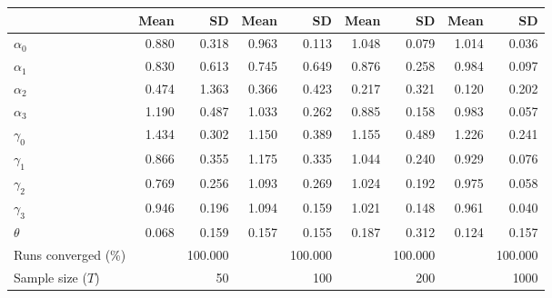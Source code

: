 
\begin{tabular}[t]{lrrrrrrrr}
\toprule
  & Mean & SD & Mean  & SD  & Mean   & SD   & Mean    & SD   \\
\midrule
$\alpha_{0}$ & 0.880 & 0.318 & 0.963 & 0.113 & 1.048 & 0.079 & 1.014 & 0.036\\
$\alpha_{1}$ & 0.830 & 0.613 & 0.745 & 0.649 & 0.876 & 0.258 & 0.984 & 0.097\\
$\alpha_{2}$ & 0.474 & 1.363 & 0.366 & 0.423 & 0.217 & 0.321 & 0.120 & 0.202\\
$\alpha_{3}$ & 1.190 & 0.487 & 1.033 & 0.262 & 0.885 & 0.158 & 0.983 & 0.057\\
$\gamma_{0}$ & 1.434 & 0.302 & 1.150 & 0.389 & 1.155 & 0.489 & 1.226 & 0.241\\
$\gamma_{1}$ & 0.866 & 0.355 & 1.175 & 0.335 & 1.044 & 0.240 & 0.929 & 0.076\\
$\gamma_{2}$ & 0.769 & 0.256 & 1.093 & 0.269 & 1.024 & 0.192 & 0.975 & 0.058\\
$\gamma_{3}$ & 0.946 & 0.196 & 1.094 & 0.159 & 1.021 & 0.148 & 0.961 & 0.040\\
$\theta$ & 0.068 & 0.159 & 0.157 & 0.155 & 0.187 & 0.312 & 0.124 & 0.157\\
Runs converged (\%) &  & 100.000 &  & 100.000 &  & 100.000 &  & 100.000\\
Sample size ($T$) &  & 50 &  & 100 &  & 200 &  & 1000\\
\bottomrule
\end{tabular}
